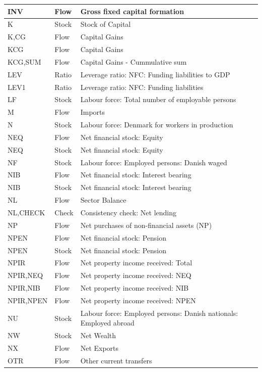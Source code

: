 \documentclass[
]{book}
\begin{document}
\begin{tabular}[t]{l|l|l}
\hline
INV & Flow & Gross fixed capital formation\\
\hline
K & Stock & Stock of Capital\\
\hline
K,CG & Flow & Capital Gains\\
\hline
KCG & Flow & Capital Gains\\
\hline
KCG,SUM & Flow & Capital Gains - Cummulative sum\\
\hline
LEV & Ratio & Leverage ratio: NFC: Funding liabilities to GDP\\
\hline
LEV1 & Ratio & Leverage ratio: NFC: Funding liabilities\\
\hline
LF & Stock & Labour force: Total number of employable persons\\
\hline
M & Flow & Imports\\
\hline
N & Stock & Labour force: Denmark for workers in production\\
\hline
NEQ & Flow & Net financial stock: Equity\\
\hline
NEQ & Stock & Net financial stock: Equity\\
\hline
NF & Stock & Labour force: Employed persons: Danish waged\\
\hline
NIB & Flow & Net financial stock: Interest bearing\\
\hline
NIB & Stock & Net financial stock: Interest bearing\\
\hline
NL & Flow & Sector Balance\\
\hline
NL,CHECK & Check & Consistency check: Net lending\\
\hline
NP & Flow & Net purchases of non-financial assets (NP)\\
\hline
NPEN & Flow & Net financial stock: Pension\\
\hline
NPEN & Stock & Net financial stock: Pension\\
\hline
NPIR & Flow & Net property income received: Total\\
\hline
NPIR,NEQ & Flow & Net property income received: NEQ\\
\hline
NPIR,NIB & Flow & Net property income received: NIB\\
\hline
NPIR,NPEN & Flow & Net property income received: NPEN\\
\hline
NU & Stock & Labour force: Employed persons: Danish nationals: Employed abroad\\
\hline
NW & Stock & Net Wealth\\
\hline
NX & Flow & Net Exports\\
\hline
OTR & Flow & Other current transfers\\

\end{tabular}
\end{document}
